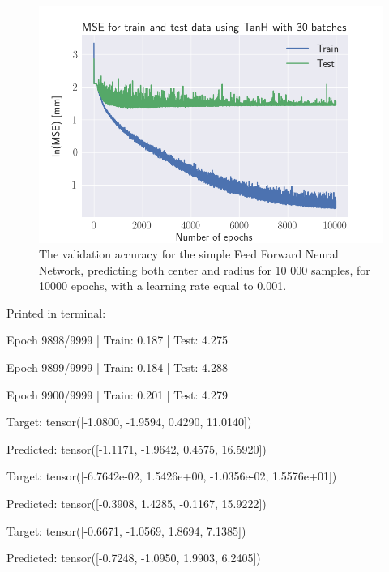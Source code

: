 \documentclass[a4paper, UKenglish, 11pt]{uiomaster}
\begin{document}
\begin{figure}[!htb]
    \centering
    \includegraphics[width=\linewidth]{../Code/plots/finals/MSE_dipole_area_lr0.001_l1_20mm_TanH_30_10000.png}
    \caption{The validation accuracy for the simple Feed Forward Neural Network, predicting both center and radius for 10 000 samples, for 10000 epochs, with a learning rate equal to 0.001.}
    \label{fig:dipole_area_result}
\end{figure}


Printed in terminal:

Epoch 9898/9999 | Train:  0.187 | Test:  4.275

Epoch 9899/9999 | Train:  0.184 | Test:  4.288

Epoch 9900/9999 | Train:  0.201 | Test:  4.279


Target: tensor([-1.0800, -1.9594,  0.4290, 11.0140])

Predicted: tensor([-1.1171, -1.9642,  0.4575, 16.5920])


Target: tensor([-6.7642e-02,  1.5426e+00, -1.0356e-02,  1.5576e+01])

Predicted: tensor([-0.3908,  1.4285, -0.1167, 15.9222])


Target: tensor([-0.6671, -1.0569,  1.8694,  7.1385])

Predicted: tensor([-0.7248, -1.0950,  1.9903,  6.2405])
\end{document}
